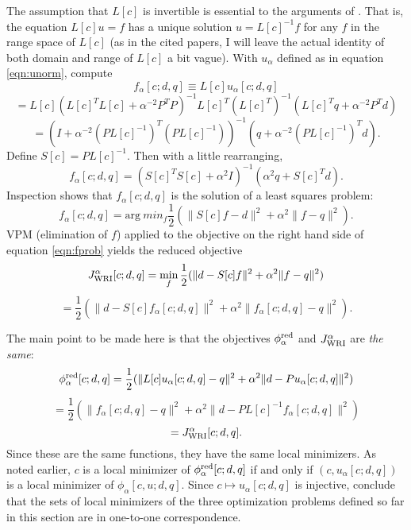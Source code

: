 The assumption that $L[c]$ is invertible is essential to the
arguments of \cite{LeeuwenHerrmannWRI:13,LeeuwenHerrmann:16}. That is, the
equation $L[c]u=f$ has a unique solution $u=L[c]^{-1}f$ for any $f$ in
the range space of $L[c]$ (as in the cited papers, I will leave the
actual identity of both domain and range of $L[c]$ a bit vague). With
$u_{\alpha}$ defined as in equation \ref{eqn:unorm}, compute
\[
  f_{\alpha}[c;d,q] \equiv L[c]u_{\alpha}[c;d,q]
\]
\[
  = L[c](L[c]^TL[c] + \alpha^{-2} P^TP)^{-1}L[c]^T(L[c]^T)^{-1}(L[c]^Tq  +
  \alpha^{-2}P^Td)
\]
\[
 = (I + \alpha^{-2}(PL[c]^{-1})^T(PL[c]^{-1}))^{-1}(q +
  \alpha^{-2}(PL[c]^{-1})^Td).
\]
Define $S[c] = PL[c]^{-1}$. Then with a little rearranging,
\begin{equation}
  \label{eqn:fnorm}
   f_{\alpha}[c;d,q] = (S[c]^TS[c] + \alpha^2 I)^{-1}(\alpha^2q + S[c]^Td).
\end{equation}
Inspection shows that $f_{\alpha}[c;d,q]$ is the solution of a least
squares problem:
\begin{equation}
  \label{eqn:fprob}
  f_{\alpha}[c;d,q]=\mbox{arg}\
 min_f \frac{1}{2}(\|S[c]f-d\|^2 +
  \alpha^2\|f-q\|^2).
\end{equation}
VPM (elimination of $f$) applied to the objective on the right hand
side of equation \ref{eqn:fprob} yields the reduced objective
\[
  J_{\rm WRI}^{\alpha}[c;d,q] =
  \min_f \frac{1}{2}(\| d-S[c]f\|^2+\alpha^2\|f-q\|^2)
\]
\begin{equation}
  \label{eqn:fvpm}
  =\frac{1}{2}(\|d-S[c]f_{\alpha}[c;d,q]\|^2 +
  \alpha^2\|f_{\alpha}[c;d,q]-q\|^2).
\end{equation}

The main point to be made here is that the objectives
$\phi_{\alpha}^{\rm red}$ and $J_{\rm WRI}^{\alpha}$ are {\em the
  same}:
\[
  \phi_{\alpha}^{\rm red}[c;d,q] =
  \frac{1}{2}(\|L[c]u_{\alpha}[c;d,q]-q\|^2
  +\alpha^2\|d-Pu_{\alpha}[c;d,q]\|^2)
\]
\[
  =\frac{1}{2}(\|f_{\alpha}[c;d,q]-q\|^2+\alpha^2\|d-PL[c]^{-1}f_{\alpha}[c;d,q]\|^2)
\]
\begin{equation}
  \label{eqn:fu}
  =J^{\alpha}_{\rm WRI}[c;d,q].
\end{equation}
Since these are the same functions, they have the same local
minimizers. As noted earlier, $c$ is a local minimizer of
$\phi_{\alpha}^{\rm red}[c;d,q]$ if and only if
$(c,u_{\alpha}[c;d,q])$ is a local minimizer of
$\phi_{\alpha}[c,u;d,q]$. Since $c \mapsto u_{\alpha}[c;d,q]$ is
injective, conclude that the sets of local minimizers of the three
optimization problems defined so far in this section are in one-to-one correspondence.

